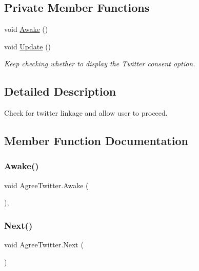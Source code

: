 \subsection*{Private Member Functions}
\begin{DoxyCompactItemize}
\item 
void \mbox{\hyperlink{class_agree_twitter_ac14f26c38898b7e0afec3f3d5310e756}{Awake}} ()
\item 
void \mbox{\hyperlink{class_agree_twitter_a325b77b472b59d10711f6c61e22beecf}{Update}} ()
\begin{DoxyCompactList}\small\item\em Keep checking whether to display the Twitter consent option. \end{DoxyCompactList}\end{DoxyCompactItemize}


\subsection{Detailed Description}
Check for twitter linkage and allow user to proceed. 

\subsection{Member Function Documentation}
\mbox{\label{class_agree_twitter_ac14f26c38898b7e0afec3f3d5310e756}} 
\subsubsection{\texorpdfstring{Awake()}{Awake()}}
{\footnotesize\ttfamily void Agree\+Twitter.\+Awake (\begin{DoxyParamCaption}{ }\end{DoxyParamCaption})\hspace{0.3cm}{\ttfamily [inline]}, {\ttfamily [private]}}

\mbox{\label{class_agree_twitter_abeb68444f8f36f2eace07d276ed9970c}} 
\subsubsection{\texorpdfstring{Next()}{Next()}}
{\footnotesize\ttfamily void Agree\+Twitter.\+Next (\begin{DoxyParamCaption}{ }\end{DoxyParamCaption})\hspace{0.3cm}{\ttfamily [inline]}}




